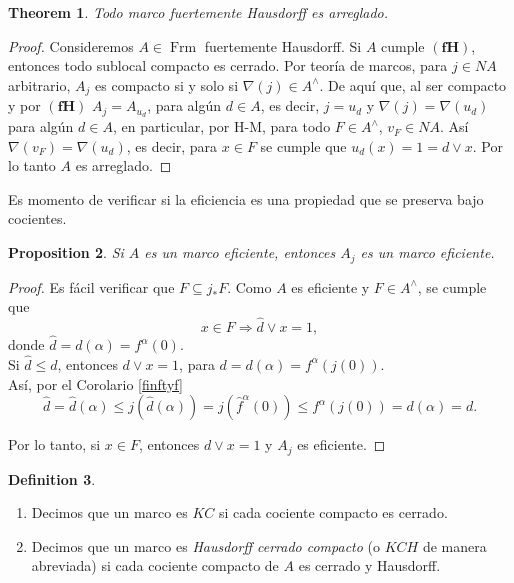 \documentclass[11pt]{amsart}
\DeclareMathOperator{\Frm}{Frm}
\theoremstyle{plain}
\newtheorem{thm}{Theorem}[section]
\newtheorem{prop}[thm]{Proposition}
\theoremstyle{definition}
\newtheorem{dfn}[thm]{Definition}
\begin{document}

\begin{thm}
    Todo marco fuertemente Hausdorff es arreglado.
\end{thm}

\begin{proof}
    Consideremos $A\in \Frm$ fuertemente Hausdorff. Si $A$ cumple $\mathbf{(fH)}$, entonces todo sublocal compacto es cerrado. Por teoría de marcos, para $j\in NA$ arbitrario, $A_j$ es compacto si y solo si $\nabla(j)\in A^\wedge$. De aquí que, al ser compacto y por $\mathbf{(fH)}$ $A_j=A_{u_d}$, para algún $d\in A$, es decir, $j=u_d$ y $\nabla(j)=\nabla(u_d)$ para algún $d\in A$, en particular, por H-M, para todo $F\in A^\wedge$, $v_F\in NA$. Así $\nabla(v_F)=\nabla(u_d)$, es decir, para $x\in F$ se cumple que $u_d(x)=1=d\vee x$. Por lo tanto $A$ es arreglado.
\end{proof}

Es momento de verificar si la eficiencia es una propiedad que se preserva bajo cocientes.

\begin{prop}\label{tidyquout}
    Si $A$ es un marco eficiente, entonces $A_j$ es un marco eficiente.
\end{prop}

\begin{proof}
Es fácil verificar que $F\subseteq j_*F$. Como $A$ es eficiente y $F\in A^\wedge$, se cumple que 
\[
x\in F\Rightarrow \hat{d}\vee x=1,
\]
donde $\hat{d}=d(\alpha)=f^\alpha(0)$.\\

Si $\hat{d}\leq d$, entonces $d\vee x=1$, para $d=d(\alpha)=f^\alpha(j(0))$.\\

Así, por el Corolario \ref{finftyf}
\[
\hat{d}=\hat{d}(\alpha)\leq j(\hat{d}(\alpha))=j(\hat{f}^\alpha(0))\leq f^\alpha(j(0))=d(\alpha)=d.
\]

Por lo tanto, si $x\in F$, entonces $d\vee x=1$ y $A_j$ es eficiente.
\end{proof}

\begin{dfn}\label{KC y KCH}
\begin{enumerate}
    \item Decimos que un marco es $KC$ si cada cociente compacto es cerrado.

    \item Decimos que un marco es \emph{Hausdorff cerrado compacto} (o $KCH$ de manera abreviada) si cada cociente compacto de $A$ es cerrado y Hausdorff.
\end{enumerate}
\end{dfn}
\end{document}
